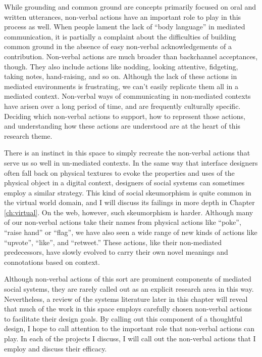 While grounding and common ground are concepts primarily focused on oral and written utterances, non-verbal actions have an important role to play in this process as well. When people lament the lack of ``body language'' in mediated communication, it is partially a complaint about the difficulties of building common ground in the absence of easy non-verbal acknowledgements of a contribution. Non-verbal actions are much broader than backchannel acceptances, though. They also include actions like nodding, looking attentive, fidgeting, taking notes, hand-raising, and so on. Although the lack of these actions in mediated environments is frustrating, we can't easily replicate them all in a mediated context. Non-verbal ways of communicating in non-mediated contexts have arisen over a long period of time, and are frequently culturally specific. Deciding which non-verbal actions to support, how to represent those actions, and understanding how these actions are understood are at the heart of this research theme.

There is an instinct in this space to simply recreate the non-verbal actions that serve us so well in un-mediated contexts. In the same way that interface designers often fall back on physical textures to evoke the properties and uses of the physical object in a digital context, designers of social systems can sometimes employ a similar strategy. This kind of social skeumorphism is quite common in the virtual world domain, and I will discuss its failings in more depth in Chapter \ref{ch:virtual}. On the web, however, such skeumorphism is harder. Although many of our non-verbal actions take their names from physical actions like ``poke'', ``raise hand'' or ``flag'', we have also seen a wide range of new kinds of actions like ``upvote'', ``like'', and ``retweet.'' These actions, like their non-mediated predecessors, have slowly evolved to carry their own novel meanings and connotations based on context.

Although non-verbal actions of this sort are prominent components of mediated social systems, they are rarely called out as an explicit research area in this way. Nevertheless, a review of the systems literature later in this chapter will reveal that much of the work in this space employs carefully chosen non-verbal actions to facilitate their design goals. By calling out this component of a thoughtful design, I hope to call attention to the important role that non-verbal actions can play. In each of the projects I discuss, I will call out the non-verbal actions that I employ and discuss their efficacy.


